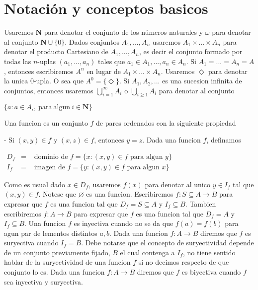 \section{Notación y conceptos basicos}

Usaremos \(\mathbf{N}\) para denotar el conjunto de los números naturales y \( \omega \) para denotar al conjunto
\(\mathbf{N}\cup \{0\}\). Dados conjuntos \( A_{1},...,A_{n}\) usaremos \(A_{1}\times ...\times A_{n}\) para denotar el
producto Cartesiano de \(A_{1},...,A_{n}\), es decir el conjunto formado por todas las \(n\)-uplas \((a_{1},...,a_{n})\)
tales que \(a_{1}\in A_{1},...,a_{n}\in A_{n}\). Si \(A_{1}=...=A_{n}=A\), entonces escribiremos \( A^{n}\) en lugar de
\(A_{1}\times ...\times A_{n}.\) Usaremos \(\Diamond \) para denotar la unica \(0\)-upla. O sea que \(A^{0}=\{\Diamond
\}\). Si \( A_{1},A_{2},...\) es una sucesion infinita de conjuntos, entonces usaremos \( \bigcup\nolimits_{i=1}^{\infty
}A_{i}\) o \(\bigcup\nolimits_{i\geq 1}A_{i}\) para denotar al conjunto

\(\displaystyle \{a:a\in A_{i}\mathrm{,\ para\ algun\ }i\in \mathbf{N}\} \)

Una funcion es un conjunto \(f\) de pares ordenados con la siguiente propiedad

- Si \((x,y)\in f\) y \((x,z)\in f\), entonces \(y=z\).
Dada una funcion \(f\), definamos

\(\displaystyle \begin{array}{rcl} D_{f} & =& \text{ dominio de }f=\{x:(x,y)\in f\text{ para algun }y\} \\ I_{f} & =& \text{ imagen de }f=\{y:(x,y)\in f\text{ para algun }x\} \end{array} \)

Como es usual dado \(x\in D_{f}\), usaremos \(f(x)\) para denotar al unico \(y\in I_{f}\) tal que \((x,y)\in f\). Notese que \(\varnothing \) es una funcion.
Escribiremos \(f:S\subseteq A\rightarrow B\) para expresar que \(f\) es una funcion tal que \(D_{f}=S\subseteq A\) y \(I_{f}\subseteq B\). Tambien escribiremos \(f:A\rightarrow B\) para expresar que \(f\) es una funcion tal que \(D_{f}=A\) y \(I_{f}\subseteq B\). Una funcion \(f\) es inyectiva cuando no se da que \(f(a)=f(b)\) para agun par de lementos distintos \(a,b\). Dada una funcion \(f:A\rightarrow B\) diremos que \(f\) es suryectiva cuando \( I_{f}=B\). Debe notarse que el concepto de suryectividad depende de un conjunto previamente fijado, \(B\) el cual contenga a \(I_{f}\), no tiene sentido hablar de la suryectividad de una funcion \(f\) si no decimos respecto de que conjunto lo es. Dada una funcion \(f:A\rightarrow B\) diremos que \(f\) es biyectiva cuando \(f\) sea inyectiva y suryectiva.

